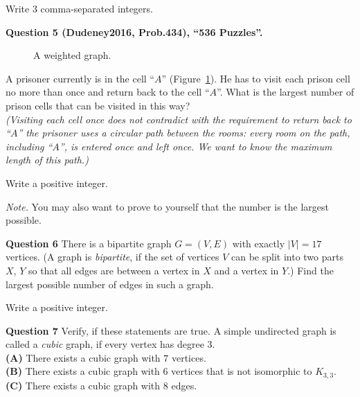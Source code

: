 \documentclass[jou]{apa6}
\begin{document}
Write $3$ comma-separated integers.



\vspace{10pt}
{\bf Question 5 (Dudeney2016, Prob.434), ``536 Puzzles''.}

\begin{figure}[!htb]
\caption{\label{fig:prison-cells} A weighted graph.}
\end{figure}

A prisoner currently is in the cell ``$A$'' (Figure~\ref{fig:prison-cells}). He has to visit each 
prison cell no more than once and return 
back to the cell ``$A$''. What is the largest number of prison cells that
can be visited in this way?\\
{\em (Visiting each cell once does not contradict with the requirement to return back 
to ``$A$'' \textendash{} the prisoner uses a circular path between the rooms: 
every room on the path, including ``$A$'', is entered once and left once. We want
to know the maximum length of this path.)}

Write a positive integer.

{\em Note.} You may also want to prove to yourself that the number is the largest possible.


\vspace{10pt}
{\bf Question 6}
There is a bipartite graph $G=(V,E)$ with exactly $|V| = 17$ vertices. (A graph is {\em bipartite}, if 
the set of vertices $V$ can be split into two parts $X$, $Y$ so that all edges are between a vertex in $X$ and a vertex in $Y$.)
Find the largest possible number of edges in such a graph. 

Write a positive integer.
 

\vspace{10pt}
{\bf Question 7} Verify, if these statements are true. 
A simple undirected graph is called a {\em cubic} graph, 
if every vertex has degree $3$.\\
{\bf (A)} There exists a cubic graph with $7$ vertices.\\
{\bf (B)} There exists a cubic graph with $6$ vertices that is not isomorphic to $K_{3,3}$.\\
{\bf (C)} There exists a cubic graph with $8$ edges.
\end{document}
